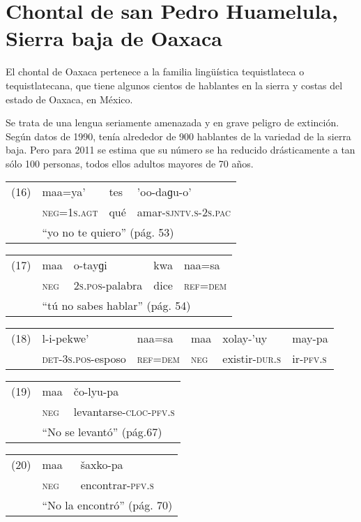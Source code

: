 \section*{Chontal de san Pedro Huamelula, Sierra baja de Oaxaca}

\noindent El chontal de Oaxaca pertenece a la familia lingüística tequistlateca o tequistlatecana, que tiene algunos cientos de hablantes en la sierra y costas del estado de Oaxaca, en México.

Se trata de una lengua seriamente amenazada y en grave peligro de extinción. Según datos de 1990, tenía alrededor de 900 hablantes de la variedad de la sierra baja. Pero para 2011 se estima que su número se ha reducido drásticamente a tan sólo 100 personas, todos ellos adultos mayores de 70 años. \vspace{0.5cm}

{\setmainfont{Doulos SIL}
\begin{tabular}{llll}
	(16) & maa=ya'& tes & 'oo-daɡu-o' \\
	& \textsc{neg}=\textsc{1s.agt} & qué & amar-\textsc{sjntv.s-2s.pac} \\
	& \multicolumn{3}{l}{``yo no te quiero'' (pág. 53)}
\end{tabular} \vspace{0.5cm}

\begin{tabular}{lllll}
	(17) & maa & o-tayɡi & kwa & naa=sa \\
	& \textsc{neg} & \textsc{2s.pos}-palabra & dice & \textsc{ref=dem} \\
	& \multicolumn{4}{l}{``tú no sabes hablar'' (pág. 54)}
\end{tabular} \vspace{0.5cm}

\begin{tabular}{llllll} %
	(18) & l-i-pekwe’ & naa=sa & maa & xolay-’uy & may-pa \\
	& \textsc{det-3s.pos}-esposo & \textsc{ref=dem} & \textsc{neg} & existir-\textsc{dur.s} & ir-\textsc{pfv.s} \\
\end{tabular} \vspace{0.5cm}

\begin{tabular}{lll}
	(19) & maa & čo-lyu-pa \\
	& \textsc{neg} & levantarse-\textsc{cloc-pfv.s} \\
	& \multicolumn{2}{l}{``No se levantó'' (pág.67)}
\end{tabular} \vspace{0.5cm}

\begin{tabular}{lll}
	(20) & maa & šaxko-pa \\
	& \textsc{neg} & encontrar-\textsc{pfv.s} \\
	& \multicolumn{2}{l}{``No la encontró'' (pág. 70)}
\end{tabular} \vspace{0.5cm}
}

